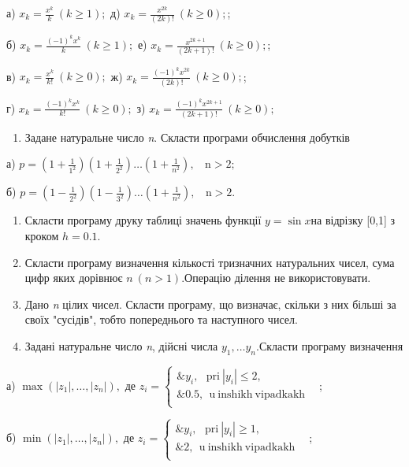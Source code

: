 \documentclass[]{article}
\begin{document}
а) \(x_{k} = \frac{x^{k}}{k}\ (k \geq 1);\) д)
\(x_{k} = \frac{x^{2k}}{(2k)!}\ (k \geq 0);\);

б) \(x_{k} = \frac{( - 1)^{k}x^{k}}{k}\ (k \geq 1);\) е)
\(x_{k} = \frac{x^{2k + 1}}{(2k + 1)!}\ (k \geq 0);\);

в) \(x_{k} = \frac{x^{k}}{k!}\ (k \geq 0);\) ж)
\(x_{k} = \frac{( - 1)^{k}x^{2k}}{(2k)!}\ (k \geq 0);\);

г) \(x_{k} = \frac{( - 1)^{k}x^{k}}{k!}\ (k \geq 0);\) з)
\(x_{k} = \frac{( - 1)^{k}x^{2k + 1}}{(2k + 1)!}\ (k \geq 0);\)

\begin{enumerate}
\def\labelenumi{\arabic{enumi})}
\item
  Задане натуральне число \emph{n}. Скласти програми обчислення добутків
\end{enumerate}

а)
\(p = \left( 1 + \frac{1}{1^{2}} \right)\left( 1 + \frac{1}{2^{2}} \right)\ldots\left( 1 + \frac{1}{n^{2}} \right),\mathrm{\ \ \ \ n > 2};\)

б)
\(p = \left( 1 - \frac{1}{2^{2}} \right)\left( 1 - \frac{1}{3^{2}} \right)\ldots\left( 1 + \frac{1}{n^{2}} \right),\mathrm{\ \ \ \ n > 2.}\)

\begin{enumerate}
\def\labelenumi{\arabic{enumi})}
\item
  Скласти програму друку таблиці значень функції \(y = \sin x\)на
  відрізку {[}0,1{]} з кроком \(h = 0.1.\)
\item
  Скласти програму визначення кількості тризначних натуральних чисел,
  сума цифр яких дорівнює \(n\ (n > 1).\)Операцію ділення не
  використовувати.
\item
  Дано \emph{n} цілих чисел. Скласти програму, що визначає, скільки з
  них більші за своїх "сусідів", тобто попереднього та наступного чисел.
\item
  Задані натуральне число \emph{n}, дійсні числа
  \(y_{1},\ldots y_{n}.\)Скласти програму визначення
\end{enumerate}

а) \(\max(\left| z_{1} \right|,\ldots,\left| z_{n} \right|),\) де
\(z_{i} = \left\{ \begin{matrix}
\& y_{i},\mathrm{\ \ \ pri\ }\left| y_{i} \right| \leq 2, \\
\& 0.5,\mathrm{\ \ u\ inshikh\ vipadkakh\ \ \ } \\
\end{matrix} \right.\ \);

б) \(\min(\left| z_{1} \right|,\ldots,\left| z_{n} \right|),\) де
\(z_{i} = \left\{ \begin{matrix}
\& y_{i},\mathrm{\ \ \ pri\ }\left| y_{i} \right| \geq 1, \\
\& 2,\mathrm{\ \ u\ inshikh\ vipadkakh\ \ \ } \\
\end{matrix} \right.\ \);
\end{document}
